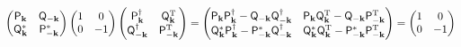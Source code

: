 \begin{equation}
    \begin{pmatrix}
       \mathsf{P}_{\mathbf{k}} & \mathsf{Q}_{-\mathbf{k}} \\ 
       \mathsf{Q}_{\mathbf{k}}^{*} & \mathsf{P}_{-\mathbf{k}}^{*}
    \end{pmatrix}
    \begin{pmatrix}
        1 & 0 \\ 0 & -1
    \end{pmatrix}
    \begin{pmatrix}
       \mathsf{P}_{\mathbf{k}}^{\dagger} & \mathsf{Q}_{\mathbf{k}}^{\rm T} \\ 
       \mathsf{Q}_{-\mathbf{k}}^{\dagger} & \mathsf{P}_{-\mathbf{k}}^{\rm T}
    \end{pmatrix} 
    = 
    \begin{pmatrix} 
        \mathsf{P}_{\mathbf{k}}\mathsf{P}_{\mathbf{k}}^{\dagger} - \mathsf{Q}_{-\mathbf{k}}\mathsf{Q}_{-\mathbf{k}}^{\dagger} & 
        \mathsf{P}_{\mathbf{k}}\mathsf{Q}_{\mathbf{k}}^{\rm T}   - \mathsf{Q}_{-\mathbf{k}}\mathsf{P}_{-\mathbf{k}}^{\rm T}     \\
        \mathsf{Q}_{\mathbf{k}}^{*}\mathsf{P}_{\mathbf{k}}^{\dagger} - \mathsf{P}_{-\mathbf{k}}^{*}\mathsf{Q}_{-\mathbf{k}}^{\dagger} & 
            \mathsf{Q}_{\mathbf{k}}^{*}\mathsf{Q}_{\mathbf{k}}^{\rm T} - \mathsf{P}_{-\mathbf{k}}^{*}\mathsf{P}_{-\mathbf{k}}^{\rm T}
    \end{pmatrix}
    = 
    \begin{pmatrix}
        1 & 0 \\ 0 & -1
    \end{pmatrix}
\end{equation}

